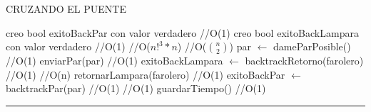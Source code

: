 \begin{algorithm}[H]
\caption{CRUZANDO EL PUENTE}
\begin{algorithmic}[1]
\state creo bool exitoBackPar con valor verdadero \hfill //O(1)
\state creo bool exitoBackLampara con valor verdadero \hfill //O(1)
 \hfill //O($n!^{3} \ast n$)
 \hfill //O($\binom {n}{2}$)
\state par $\gets$ dameParPosible() \hfill //O(1)
\state enviarPar(par) \hfill //O(1)
\Else
\state exitoBackLampara $\gets$ backtrackRetorno(farolero) \hfill //O(1)
\endif
{} \hfill //O(n)
\state retornarLampara(farolero) \hfill //O(1)
\Else
\state exitoBackPar $\gets$ backtrackPar(par) \hfill //O(1)
\endif
{} \hfill //O(1)
\state guardarTiempo() \hfill //O(1)
\endif
\endwhile
\EndFunction 
\end{algorithmic}
\hrule
{}
\end{algorithm}


